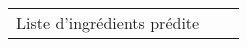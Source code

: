 \begin{longtable}{p{9cm}p{9cm}c}
                                                                                                                                                                                                                                                                                                                                                                                                                                                                                                                                                                                                                                                                                                                                                                                                                                                                                                                                                                                                                                                                                                                                                                                                                                                                                                                                                                                                                                                                                                                                                                                                                                                                                                                                                                                                                                                                                                                                                                                                                                                                                                                                                         Liste d'ingrédients prédite &                                                                                                                                                                                                                                                                                                                                                                                                                                                                                                                                                                                                                                                                                                                                                                                                                                                                                                                                                                                                                                                                                                                                                                                                                                                 
\end{longtable}
